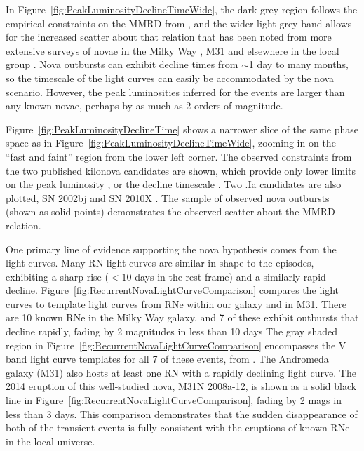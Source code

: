 In Figure~\ref{fig:PeakLuminosityDeclineTimeWide}, the dark grey
region follows the empirical constraints on the MMRD from
\citet{DellaValle:1995}, and the wider light grey band allows for the
increased scatter about that relation that has been noted from more
extensive surveys of novae in the Milky Way \citep{Downes:2000}, M31
\citep{Shafter:2011} and elsewhere in the local group
\citep{Kasliwal:2011a}.  Nova outbursts can exhibit decline times from
$\sim$1 day to many months, so the timescale of the \spock light
curves can easily be accommodated by the nova scenario. However, the
peak luminosities inferred for the \spock events are larger than any
known novae, perhaps by as much as 2 orders of magnitude.

Figure~\ref{fig:PeakLuminosityDeclineTime} shows a narrower slice of
the same phase space as in
Figure~\ref{fig:PeakLuminosityDeclineTimeWide}, zooming in on the
``fast and faint'' region from the lower left corner.  The observed
constraints from the two published kilonova candidates are shown,
which provide only lower limits on the peak luminosity
\citep{Tanvir:2013}, or the decline timescale \citep{Perley:2009}.
Two .Ia candidates are also plotted, SN 2002bj \citep{Poznanski:2010}
and SN 2010X \citep{Kasliwal:2010}.  The sample of observed nova
outbursts (shown as solid points) demonstrates the observed scatter
about the MMRD relation.

One primary line of evidence supporting the nova hypothesis
comes from the \spock light curves. Many RN light curves are similar
in shape to the \spock episodes, exhibiting a sharp rise ($<10$ days
in the rest-frame) and a similarly rapid decline.
Figure~\ref{fig:RecurrentNovaLightCurveComparison} compares the \spock
light curves to template light curves from RNe within our galaxy and
in M31.  There are 10 known RNe in the Milky Way galaxy, and 7 of
these exhibit outbursts that decline rapidly, fading by 2 magnitudes
in less than 10 days \citep{Schaefer:2010}
The gray shaded region in
Figure~\ref{fig:RecurrentNovaLightCurveComparison} encompasses the V
band light curve templates for all 7 of these events, from
\citet{Schaefer:2010}.  The Andromeda galaxy (M31) also hosts at least
one RN with a rapidly declining light curve.  The 2014 eruption of
this well-studied nova, M31N 2008a-12, is shown as a solid black line
in Figure~\ref{fig:RecurrentNovaLightCurveComparison}, fading by 2
mags in less than 3 days.  This comparison demonstrates that the
sudden disappearance of both of the \spock transient events is fully
consistent with the eruptions of known RNe in the local universe.

